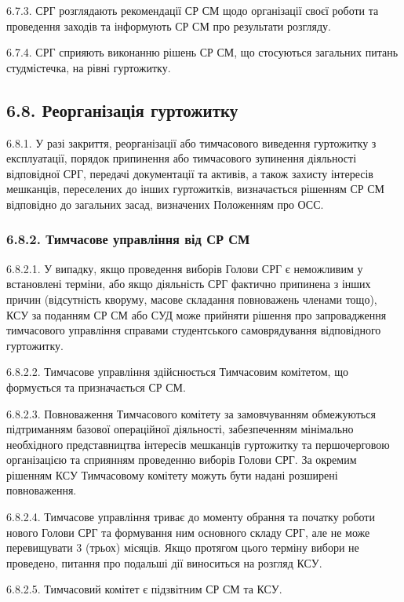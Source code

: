     6.7.3. СРГ розглядають рекомендації СР СМ щодо організації своєї роботи та проведення заходів та інформують СР СМ про результати розгляду.

    6.7.4. СРГ сприяють виконанню рішень СР СМ, що стосуються загальних питань студмістечка, на рівні гуртожитку.

\subsection*{6.8. Реорганізація гуртожитку}
    6.8.1. У разі закриття, реорганізації або тимчасового виведення гуртожитку з експлуатації, порядок припинення або тимчасового зупинення діяльності відповідної СРГ, передачі документації та активів, а також захисту інтересів мешканців, переселених до інших гуртожитків, визначається рішенням СР СМ відповідно до загальних засад, визначених Положенням про ОСС.

    \subsubsection*{6.8.2. Тимчасове управління від СР СМ}

        6.8.2.1. У випадку, якщо проведення виборів Голови СРГ є неможливим у встановлені терміни, або якщо діяльність СРГ фактично припинена з інших причин (відсутність кворуму, масове складання повноважень членами тощо), КСУ за поданням СР СМ або СУД може прийняти рішення про запровадження тимчасового управління справами студентського самоврядування відповідного гуртожитку.

        6.8.2.2. Тимчасове управління здійснюється Тимчасовим комітетом, що формується та призначається СР СМ.

        6.8.2.3. Повноваження Тимчасового комітету за замовчуванням обмежуються підтриманням базової операційної діяльності, забезпеченням мінімально необхідного представництва інтересів мешканців гуртожитку та першочерговою організацією та сприянням проведенню виборів Голови СРГ. За окремим рішенням КСУ Тимчасовому комітету можуть бути надані розширені повноваження.

        6.8.2.4. Тимчасове управління триває до моменту обрання та початку роботи нового Голови СРГ та формування ним основного складу СРГ, але не може перевищувати 3 (трьох) місяців. Якщо протягом цього терміну вибори не проведено, питання про подальші дії виноситься на розгляд КСУ.

        6.8.2.5. Тимчасовий комітет є підзвітним СР СМ та КСУ.
